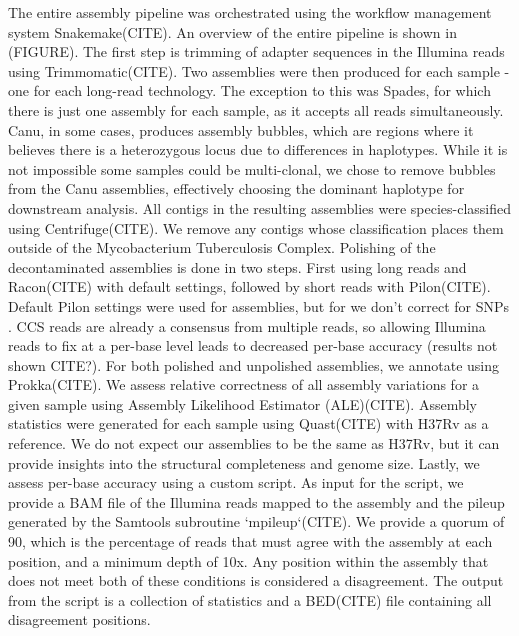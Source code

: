 \begin{markdown}
The entire assembly pipeline was orchestrated using the workflow management system Snakemake(CITE). An overview of the entire pipeline is shown in (FIGURE). The first step is trimming of adapter sequences in the Illumina reads using Trimmomatic(CITE). Two assemblies were then produced for each sample - one for each long-read technology. The exception to this was Spades, for which there is just one assembly for each sample, as it accepts all reads simultaneously. Canu, in some cases, produces assembly bubbles, which are regions where it believes there is a heterozygous locus due to differences in haplotypes. While it is not impossible some samples could be multi-clonal, we chose to remove bubbles from the Canu assemblies, effectively choosing the dominant haplotype for downstream analysis.  
All contigs in the resulting assemblies were species-classified using Centrifuge(CITE). We remove any contigs whose classification places them outside of the Mycobacterium Tuberculosis Complex.  
Polishing of the decontaminated assemblies is done in two steps. First using long reads and Racon(CITE) with default settings, followed by short reads with Pilon(CITE). Default Pilon settings were used for \ont{} assemblies, but for \pb{} we don't correct for SNPs . \pb{} CCS reads are already a consensus from multiple reads, so allowing Illumina reads to fix at a per-base level leads to decreased per-base accuracy (results not shown CITE?).  
For both polished and unpolished assemblies, we annotate using Prokka(CITE). We assess relative correctness of all assembly variations for a given sample using Assembly Likelihood Estimator (ALE)(CITE). Assembly statistics were generated for each sample using Quast(CITE) with H37Rv as a reference. We do not expect our assemblies to be the same as H37Rv, but it can provide insights into the structural completeness and genome size. Lastly, we assess per-base accuracy using a custom script. As input for the script, we provide a BAM file of the Illumina reads mapped to the assembly and the pileup generated by the Samtools subroutine `mpileup`(CITE). We provide a quorum of 90, which is the percentage of reads that must agree with the assembly at each position, and a minimum depth of 10x. Any position within the assembly that does not meet both of these conditions is considered a disagreement. The output from the script is a collection of statistics and a BED(CITE) file containing all disagreement positions.



\end{markdown}
